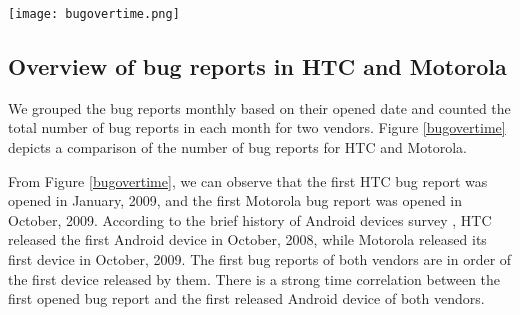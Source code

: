 \documentclass[10pt, conference, compsocconf]{IEEEtran}
\begin{document}
%
%
%

\begin{figure*}[htb]
\centering
\texttt{[image: bugovertime.png]}
\caption{Number of bug reports with the major version of Android for HTC and Motorola}
\label{bugovertime}
\end{figure*}

\subsection{Overview of bug reports in HTC and Motorola}

We grouped the bug reports monthly based on their opened date and counted the total number of bug reports in each month for two vendors. Figure \ref{bugovertime} depicts a comparison of the number of bug reports for HTC and Motorola.

From Figure \ref{bugovertime}, we can observe that the first HTC bug report was opened in January, 2009, and the first Motorola bug report was opened in October, 2009. According to the brief history of Android devices survey \cite{historyofandroid}, HTC released the first Android device in October, 2008, while Motorola released its first device in October, 2009. The first bug reports of both vendors are in order of the first device released by them. There is a strong time correlation between the first opened bug report and the first released Android device of both vendors.
\end{document}
